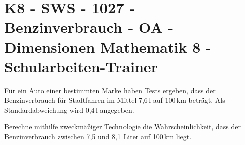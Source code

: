 \section{K8 - SWS - 1027 - Benzinverbrauch - OA - Dimensionen Mathematik 8 - Schularbeiten-Trainer}

\begin{beispiel}[K8 - SWS]{1}
Für ein Auto einer bestimmten Marke haben Tests ergeben, dass der Benzinverbrauch für Stadtfahren im Mittel 7,6\,l auf 100\,km beträgt. Als Standardabweichung wird 0,4\,l angegeben.

Berechne mithilfe zweckmäßiger Technologie die Wahrscheinlichkeit, dass der Benzinverbrauch zwischen 7,5 und 8,1 Liter auf 100\,km liegt.

\end{beispiel}